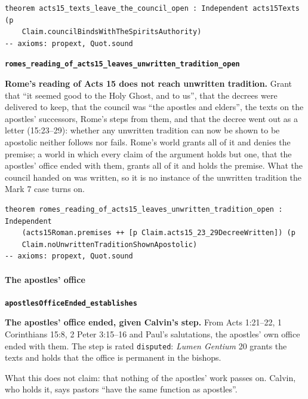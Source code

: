\documentclass[11pt]{article}
\begin{document}
{\small\begin{verbatim}
theorem acts15_texts_leave_the_council_open : Independent acts15Texts (p
    Claim.councilBindsWithTheSpiritsAuthority)
-- axioms: propext, Quot.sound
\end{verbatim}}
\par\medskip\noindent\textbf{\texttt{romes\_\allowbreak{}reading\_\allowbreak{}of\_\allowbreak{}acts15\_\allowbreak{}leaves\_\allowbreak{}unwritten\_\allowbreak{}tradition\_\allowbreak{}open}}\par\nobreak\noindent
\textbf{Rome’s reading of Acts 15 does not reach unwritten tradition.} Grant that “it seemed good to the Holy Ghost, and to us”, that the decrees were delivered to keep, that the council was “the apostles and elders”, the texts on the apostles’ successors, Rome’s steps from them, and that the decree went out as a letter (15:23–29): whether any unwritten tradition can now be shown to be apostolic neither follows nor fails. Rome’s world grants all of it and denies the premise; a world in which every claim of the argument holds but one, that the apostles’ office ended with them, grants all of it and holds the premise. What the council handed on was written, so it is no instance of the unwritten tradition the Mark 7 case turns on.

{\small\begin{verbatim}
theorem romes_reading_of_acts15_leaves_unwritten_tradition_open : Independent
    (acts15Roman.premises ++ [p Claim.acts15_23_29DecreeWritten]) (p
    Claim.noUnwrittenTraditionShownApostolic)
-- axioms: propext, Quot.sound
\end{verbatim}}
\paragraph*{The apostles’ office}
\leavevmode\par\nobreak
\par\medskip\noindent\textbf{\texttt{apostles\allowbreak{}Office\allowbreak{}Ended\_\allowbreak{}establishes}}\par\nobreak\noindent
\textbf{The apostles’ office ended, given Calvin’s step.} From Acts 1:21–22, 1 Corinthians 15:8, 2 Peter 3:15–16 and Paul’s salutations, the apostles’ own office ended with them. The step is rated \texttt{disputed}: \emph{Lumen Gentium} 20 grants the texts and holds that the office is permanent in the bishops.

What this does not claim: that nothing of the apostles’ work passes on. Calvin, who holds it, says pastors “have the same function as apostles”.
\end{document}
